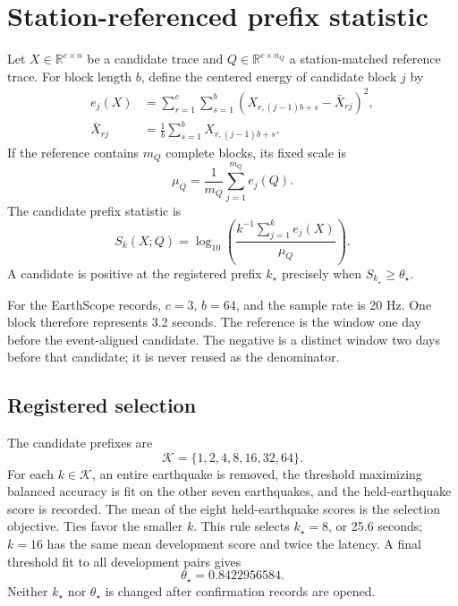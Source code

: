 \documentclass[10pt,letterpaper,twoside]{article}
\newcommand{\R}{\mathbb{R}}
\begin{document}
\section{Station-referenced prefix statistic}

Let $X\in\R^{c\times n}$ be a candidate trace and
$Q\in\R^{c\times n_Q}$ a station-matched reference trace.  For block length
$b$, define the centered energy of candidate block $j$ by
\begin{equation}
\begin{aligned}
 e_j(X)&=\sum_{r=1}^{c}\sum_{s=1}^{b}
 \left(X_{r,(j-1)b+s}-\bar X_{rj}\right)^2,\\
 \bar X_{rj}&=\frac{1}{b}\sum_{s=1}^{b}X_{r,(j-1)b+s}.
\end{aligned}
 \label{eq:block-energy}
\end{equation}
If the reference contains $m_Q$ complete blocks, its fixed scale is
\begin{equation}
 \mu_Q=\frac{1}{m_Q}\sum_{j=1}^{m_Q}e_j(Q).
 \label{eq:reference}
\end{equation}
The candidate prefix statistic is
\begin{equation}
 S_k(X;Q)=\log_{10}\left(
 \frac{k^{-1}\sum_{j=1}^{k}e_j(X)}{\mu_Q}
 \right).
 \label{eq:statistic}
\end{equation}
A candidate is positive at the registered prefix $k_\star$ precisely when
$S_{k_\star}\geq\theta_\star$.

For the EarthScope records, $c=3$, $b=64$, and the sample rate is 20 Hz.
One block therefore represents 3.2 seconds.  The reference is the window one
day before the event-aligned candidate.  The negative is a distinct window
two days before that candidate; it is never reused as the denominator.

\subsection{Registered selection}

The candidate prefixes are
\begin{equation}
 \mathcal K=\{1,2,4,8,16,32,64\}.
\end{equation}
For each $k\in\mathcal K$, an entire earthquake is removed, the threshold
maximizing balanced accuracy is fit on the other seven earthquakes, and the
held-earthquake score is recorded.  The mean of the eight held-earthquake
scores is the selection objective.  Ties favor the smaller $k$.  This rule
selects $k_\star=8$, or 25.6 seconds; $k=16$ has the same mean development
score and twice the latency.  A final threshold fit to all development pairs
gives
\begin{equation}
 \theta_\star=0.8422956584.
 \label{eq:threshold}
\end{equation}
Neither $k_\star$ nor $\theta_\star$ is changed after confirmation records are
opened.
\end{document}
